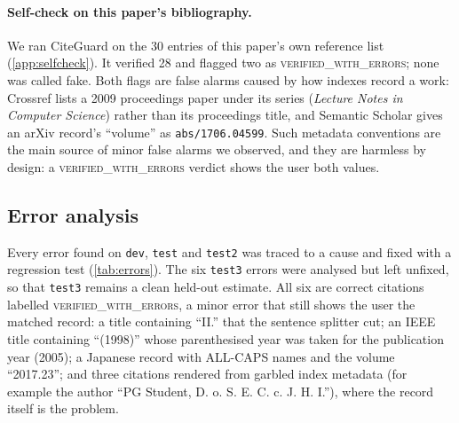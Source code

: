 \documentclass[10pt,twocolumn,a4paper]{article}
\newcommand{\verdict}[1]{\textsc{\MakeLowercase{#1}}}
\newcommand{\cg}{CiteGuard}
\begin{document}
\paragraph{Self-check on this paper's bibliography.}
We ran \cg{} on the 30 entries of this paper's own reference list (\cref{app:selfcheck}). It
verified 28 and flagged two as \verdict{VERIFIED\_WITH\_ERRORS}; none was called fake. Both flags are
false alarms caused by how indexes record a work: Crossref lists a 2009 proceedings paper under its
series (\emph{Lecture Notes in Computer Science}) rather than its proceedings title, and Semantic
Scholar gives an arXiv record's ``volume'' as \texttt{abs/1706.04599}. Such metadata conventions are
the main source of minor false alarms we observed, and they are harmless by design: a
\verdict{VERIFIED\_WITH\_ERRORS} verdict shows the user both values.

\subsection{Error analysis}
\label{sec:errors}
Every error found on \texttt{dev}, \texttt{test} and \texttt{test2} was traced to a cause and fixed
with a regression test (\cref{tab:errors}). The six \texttt{test3} errors were analysed but left
unfixed, so that \texttt{test3} remains a clean held-out estimate. All six are correct citations
labelled \verdict{VERIFIED\_WITH\_ERRORS}, a minor error that still shows the user the matched record:
a title containing ``II.'' that the sentence splitter cut; an IEEE title containing ``(1998)'' whose
parenthesised year was taken for the publication year (2005); a Japanese record with ALL-CAPS names
and the volume ``2017.23''; and three citations rendered from garbled index metadata (for example the
author ``PG Student, D. o. S. E. C. c. J. H. I.''), where the record itself is the problem.
\end{document}
